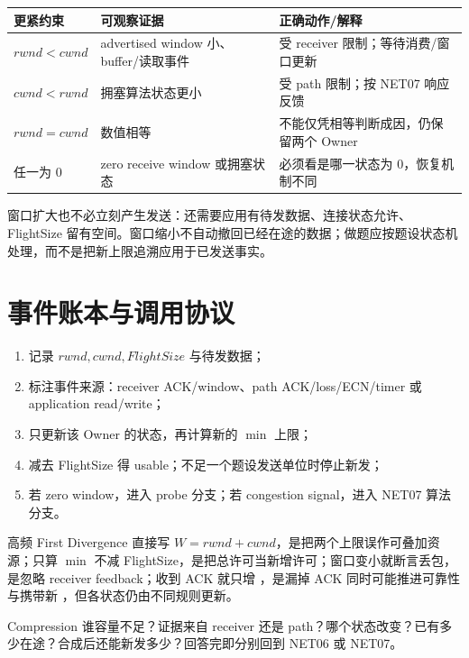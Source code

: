 \documentclass[UTF8,fontset=none,11pt,a4paper]{ctexart}
\begin{document}
\begin{center}\small
\begin{tabularx}{\linewidth}{L{2.2cm}Y Y}
\toprule
更紧约束 & 可观察证据 & 正确动作/解释\\
\midrule
$rwnd<cwnd$ & advertised window 小、buffer/读取事件 & 受 receiver 限制；等待消费/窗口更新\\
$cwnd<rwnd$ & 拥塞算法状态更小 & 受 path 限制；按 NET07 响应反馈\\
$rwnd=cwnd$ & 数值相等 & 不能仅凭相等判断成因，仍保留两个 Owner\\
任一为 0 & zero receive window 或拥塞状态 & 必须看是哪一状态为 0，恢复机制不同\\
\bottomrule
\end{tabularx}
\end{center}

窗口扩大也不必立刻产生发送：还需要应用有待发数据、连接状态允许、FlightSize 留有空间。窗口缩小不自动撤回已经在途的数据；做题应按题设状态机处理，而不是把新上限追溯应用于已发送事实。

\section{事件账本与调用协议}

\begin{enumerate}
\item 记录 $rwnd,cwnd,FlightSize$ 与待发数据；
\item 标注事件来源：receiver ACK/window、path ACK/loss/ECN/timer 或 application read/write；
\item 只更新该 Owner 的状态，再计算新的 $\min$ 上限；
\item 减去 FlightSize 得 usable；不足一个题设发送单位时停止新发；
\item 若 zero window，进入 probe 分支；若 congestion signal，进入 NET07 算法分支。
\end{enumerate}

\begin{warnbox}{高频 First Divergence}
直接写 $W=rwnd+cwnd$，是把两个上限误作可叠加资源；只算 $\min$ 不减 FlightSize，是把总许可当新增许可；窗口变小就断言丢包，是忽略 receiver feedback；收到 ACK 就只增 ，是漏掉 ACK 同时可能推进可靠性与携带新 ，但各状态仍由不同规则更新。
\end{warnbox}

\begin{corebox}{Compression}
谁容量不足？证据来自 receiver 还是 path？哪个状态改变？已有多少在途？合成后还能新发多少？回答完即分别回到 NET06 或 NET07。
\end{corebox}
\end{document}
